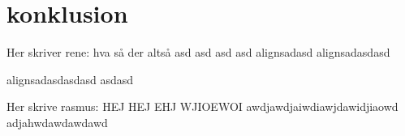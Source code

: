 \section{konklusion}
Her skriver rene:
hva så der altså asd
asd asd asd alignsadasd
alignsadasdasd

alignsadasdasdasd
asdasd

Her skrive rasmus:
HEJ HEJ EHJ WJIOEWOI
 awdjawdjaiwdiawjdawidjiaowd
 adjahwdawdawdawd
